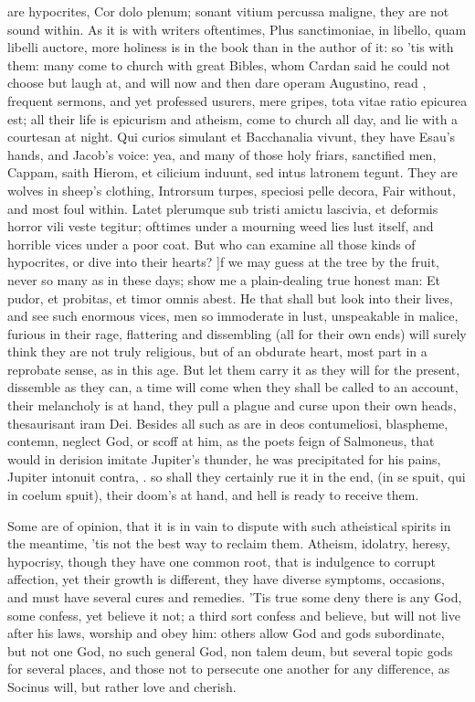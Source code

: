 {are hypocrites, Cor dolo plenum; sonant vitium percussa maligne, they
are not sound within. As it is with writers oftentimes, Plus
sanctimoniae, in libello, quam libelli auctore, more holiness is in the
book than in the author of it: so 'tis with them: many come to church
with great Bibles, whom Cardan said he could not choose but laugh at,
and will now and then dare operam Augustino, read \Austin{}, frequent
sermons, and yet professed usurers, mere gripes, tota vitae ratio
epicurea est; all their life is epicurism and atheism, come to church
all day, and lie with a courtesan at night. Qui curios simulant et
Bacchanalia vivunt, they have Esau's hands, and Jacob's voice: yea, and
many of those holy friars, sanctified men, Cappam, saith Hierom, et
cilicium induunt, sed intus latronem tegunt. They are wolves in sheep's
clothing, Introrsum turpes, speciosi pelle decora, Fair without, and
most foul within. Latet plerumque sub tristi amictu lascivia, et
deformis horror vili veste tegitur; ofttimes under a mourning weed lies
lust itself, and horrible vices under a poor coat. But who can examine
all those kinds of hypocrites, or dive into their hearts? ]f we may
guess at the tree by the fruit, never so many as in these days; show me
a plain-dealing true honest man: Et pudor, et probitas, et timor omnis
abest. He that shall but look into their lives, and see such enormous
vices, men so immoderate in lust, unspeakable in malice, furious in
their rage, flattering and dissembling (all for their own ends) will
surely think they are not truly religious, but of an obdurate heart,
most part in a reprobate sense, as in this age. But let them carry it
as they will for the present, dissemble as they can, a time will come
when they shall be called to an account, their melancholy is at hand,
they pull a plague and curse upon their own heads, thesaurisant iram
Dei. Besides all such as are in deos contumeliosi, blaspheme, contemn,
neglect God, or scoff at him, as the poets feign of Salmoneus, that
would in derision imitate Jupiter's thunder, he was precipitated for
his pains, Jupiter intonuit contra, \etc{}. so shall they certainly rue it
in the end, (in se spuit, qui in coelum spuit), their doom's at
hand, and hell is ready to receive them.

Some are of opinion, that it is in vain to dispute with such
atheistical spirits in the meantime, 'tis not the best way to reclaim
them. Atheism, idolatry, heresy, hypocrisy, though they have one common
root, that is indulgence to corrupt affection, yet their growth is
different, they have diverse symptoms, occasions, and must have several
cures and remedies. 'Tis true some deny there is any God, some confess,
yet believe it not; a third sort confess and believe, but will not live
after his laws, worship and obey him: others allow God and gods
subordinate, but not one God, no such general God, non talem deum, but
several topic gods for several places, and those not to persecute one
another for any difference, as Socinus will, but rather love and
cherish.

}
